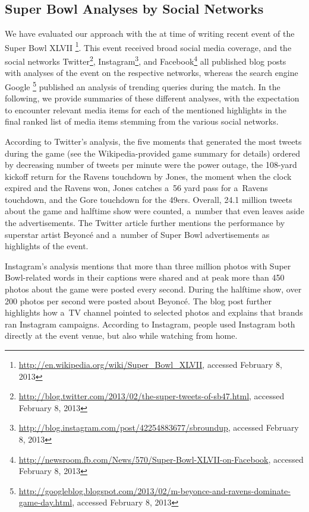 \subsection{Super Bowl Analyses by Social Networks}

We have evaluated our approach with the at time of writing
recent event of the Super Bowl XLVII%
\footnote{\url{http://en.wikipedia.org/wiki/Super_Bowl_XLVII},
accessed February 8, 2013}.
This event received broad social media coverage, and the social networks
Twitter\footnote{\url{http://blog.twitter.com/2013/02/the-super-tweets-of-sb47.html},
accessed February 8, 2013},
Instagram\footnote{\url{http://blog.instagram.com/post/42254883677/sbroundup},
accessed February 8, 2013}, and
Facebook\footnote{\url{http://newsroom.fb.com/News/570/Super-Bowl-XLVII-on-Facebook},
accessed February 8, 2013} all published blog posts with analyses of the event
on the respective networks,
whereas the search engine Google%
\footnote{\url{http://googleblog.blogspot.com/2013/02/m-beyonce-and-ravens-dominate-game-day.html},
accessed February 8, 2013}
published an analysis of trending queries during the match.
In the following, we provide summaries of these different analyses,
with the expectation to encounter relevant media items
for each of the mentioned highlights in the final ranked list of media items
stemming from the various social networks.

According to Twitter's analysis, the five moments that generated the most tweets
during the game (see the Wikipedia-provided game summary for details)
ordered by decreasing number of tweets per minute were
the power outage,
the 108-yard kickoff return for the Ravens touchdown by Jones,
the moment when the clock expired and the Ravens won,
Jones catches a~56 yard pass for a~Ravens touchdown,
and the Gore touchdown for the 49ers.
Overall, 24.1 million tweets about the game and halftime show were counted,
a~number that even leaves aside the advertisements.
The Twitter article further mentions the performance by superstar artist Beyoncé 
and a~number of Super Bowl advertisements as highlights of the event.   

Instagram's analysis mentions that more than three million photos
with Super Bowl-related words in their captions were shared and
at peak more than 450 photos about the game were posted every second.
During the halftime show, over 200 photos per second were posted about Beyoncé.
The blog post further highlights how a~TV channel pointed to selected photos
and explains that brands ran Instagram campaigns.
According to Instagram, people used Instagram both directly at the event venue,
but also while watching from home.

